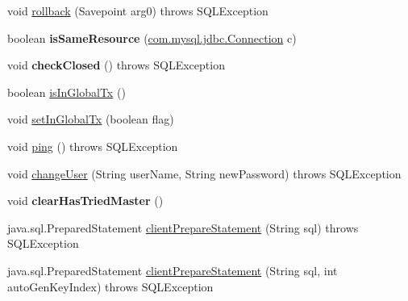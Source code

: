 \begin{DoxyCompactItemize}
\item 
void \mbox{\hyperlink{classcom_1_1mysql_1_1jdbc_1_1jdbc2_1_1optional_1_1_connection_wrapper_aff1095ad260e93297f4318969655324f}{rollback}} (Savepoint arg0)  throws S\+Q\+L\+Exception 
\item 
\mbox{\label{classcom_1_1mysql_1_1jdbc_1_1jdbc2_1_1optional_1_1_connection_wrapper_a4798177258fc161e2fe7ca6ede89c1a3}} 
boolean {\bfseries is\+Same\+Resource} (\mbox{\hyperlink{interfacecom_1_1mysql_1_1jdbc_1_1_connection}{com.\+mysql.\+jdbc.\+Connection}} c)
\item 
\mbox{\label{classcom_1_1mysql_1_1jdbc_1_1jdbc2_1_1optional_1_1_connection_wrapper_ac1213af71323d3478b8eeee2aad7ea20}} 
void {\bfseries check\+Closed} ()  throws S\+Q\+L\+Exception 
\item 
boolean \mbox{\hyperlink{classcom_1_1mysql_1_1jdbc_1_1jdbc2_1_1optional_1_1_connection_wrapper_a62dab37c7e8a78cbb34735cf016b9591}{is\+In\+Global\+Tx}} ()
\item 
void \mbox{\hyperlink{classcom_1_1mysql_1_1jdbc_1_1jdbc2_1_1optional_1_1_connection_wrapper_ad2b00fa8ecb1c3455f2f2725ca9fc29c}{set\+In\+Global\+Tx}} (boolean flag)
\item 
void \mbox{\hyperlink{classcom_1_1mysql_1_1jdbc_1_1jdbc2_1_1optional_1_1_connection_wrapper_a2c2365e7096fe3cc215832ba1f7e3594}{ping}} ()  throws S\+Q\+L\+Exception 
\item 
void \mbox{\hyperlink{classcom_1_1mysql_1_1jdbc_1_1jdbc2_1_1optional_1_1_connection_wrapper_a4c5b794f1bdf800b863c46fdcbf2ce97}{change\+User}} (String user\+Name, String new\+Password)  throws S\+Q\+L\+Exception 
\item 
\mbox{\label{classcom_1_1mysql_1_1jdbc_1_1jdbc2_1_1optional_1_1_connection_wrapper_ad8a0eb700cc106b4b1b833f475bfac66}} 
void {\bfseries clear\+Has\+Tried\+Master} ()
\item 
java.\+sql.\+Prepared\+Statement \mbox{\hyperlink{classcom_1_1mysql_1_1jdbc_1_1jdbc2_1_1optional_1_1_connection_wrapper_a8c765f36b8ba9d9a0011768a878f3275}{client\+Prepare\+Statement}} (String sql)  throws S\+Q\+L\+Exception 
\item 
java.\+sql.\+Prepared\+Statement \mbox{\hyperlink{classcom_1_1mysql_1_1jdbc_1_1jdbc2_1_1optional_1_1_connection_wrapper_af706fcb5a89569df199c821c64b7d741}{client\+Prepare\+Statement}} (String sql, int auto\+Gen\+Key\+Index)  throws S\+Q\+L\+Exception 

\end{DoxyCompactItemize}
